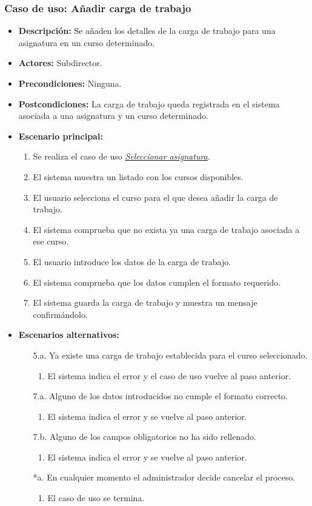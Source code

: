 \documentclass{book}
\begin{document}
\subsubsection*{Caso de uso: Añadir carga de trabajo}
\begin{itemize}
\item{\bf Descripción:} Se añaden los detalles de la carga de trabajo para una asignatura en un curso determinado.
\item{\bf Actores:} Subdirector.
\item{\bf Precondiciones:} Ninguna.
\item{\bf Postcondiciones:} La carga de trabajo queda registrada en el sistema asociada a una asignatura y un curso determinado.
\item{\bf Escenario principal:}
	\begin{enumerate}
	\item Se realiza el caso de uso {\em \hyperref[select_asignatura]{Seleccionar asignatura}}.
	\item El sistema muestra un listado con los cursos disponibles.
	\item El usuario selecciona el curso para el que desea añadir la carga de trabajo.
	\item El sistema comprueba que no exista ya una carga de trabajo asociada a ese curso.
	\item El usuario introduce los datos de la carga de trabajo.
	\item El sistema comprueba que los datos cumplen el formato requerido.
	\item El sistema guarda la carga de trabajo y muestra un mensaje confirmándolo.
	\end{enumerate}
\item{\bf Escenarios alternativos:}
	\begin{itemize}
	\item[5.a.] Ya existe una carga de trabajo establecida para el curso seleccionado.
		\begin{enumerate}
		\item El sistema indica el error y el caso de uso vuelve al paso anterior.
		\end{enumerate}
	\item[7.a.] Alguno de los datos introducidos no cumple el formato correcto.
		\begin{enumerate}
		\item El sistema indica el error y se vuelve al paso anterior.
		\end{enumerate}
	\item[7.b.] Alguno de los campos obligatorios no ha sido rellenado.
		\begin{enumerate}
		\item El sistema indica el error y se vuelve al paso anterior.
		\end{enumerate}	
	\item[*a.] En cualquier momento el administrador decide cancelar el proceso.
		\begin{enumerate}
		\item El caso de uso se termina.
		\end{enumerate}
	\end{itemize}
\end{itemize}
\end{document}
